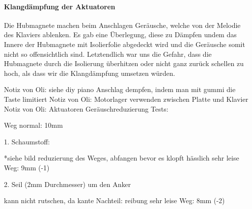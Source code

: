 \paragraph{Klangdämpfung der Aktuatoren}
Die Hubmagnete machen beim Anschlagen Geräusche, welche von der Melodie des Klaviers ablenken. Es gab eine Überlegung,
diese zu Dämpfen undem das Innere der Hubmagnete mit Isolierfolie abgedeckt wird und die Geräusche somit nicht so
offensichtlich sind. Letztendlich war uns die Gefahr, dass die Hubmagnete durch die Isolierung überhitzen oder nicht ganz
zurück schellen zu hoch, als dass wir die Klangdämpfung umsetzen würden.

Notiz von Oli: siehe diy piano Anschlag dempfen, indem man mit gummi die Taste limitiert
Notiz von Oli: Motorlager verwenden zwischen Platte und Klavier
Notiz von Oli:
Aktuatoren Geräuschreduzierung Tests:

Weg normal: 10mm

1. Schaumstoff:

*siehe bild
reduzierung des Weges, abfangen bevor es klopft
hässlich
sehr leise
Weg: 9mm (-1)

2. Seil (2mm Durchmesser) um den Anker

kann nicht rutschen, da kante
Nachteil: reibung
sehr leise
Weg: 8mm (-2)